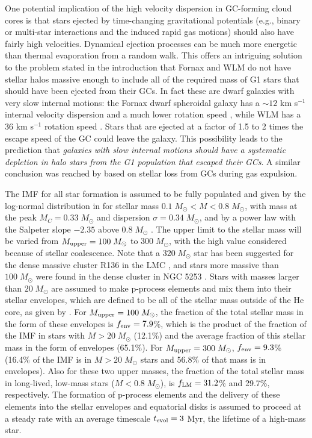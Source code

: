 \documentclass[12pt,preprint]{aastex}
\begin{document}
One potential implication of the high velocity dispersion in GC-forming cloud cores
is that stars ejected by time-changing gravitational potentials (e.g., binary or
multi-star interactions and the induced rapid gas motions) should also have fairly
high velocities. Dynamical ejection processes can be much more energetic than
thermal evaporation from a random walk.  This offers an intriguing solution to the
problem stated in the introduction that Fornax and WLM do not have stellar halos
massive enough to include all of the required mass of G1 stars that should have
been ejected from their GCs.  In fact these are dwarf galaxies with very slow
internal motions: the Fornax dwarf spheroidal galaxy has a $\sim12$ km s$^{-1}$
internal velocity dispersion and a much lower rotation speed \citep{walker06},
while WLM has a 36 km s$^{-1}$ rotation speed \citep{leaman12}. Stars that are
ejected at a factor of 1.5 to 2 times the escape speed of the GC could leave the
galaxy. This possibility leads to the prediction that {\it galaxies with slow
internal motions should have a systematic depletion in halo stars from the G1
population that escaped their GCs}.  A similar conclusion was reached by
\cite{khalaj16} based on stellar loss from GCs during gas expulsion.

The IMF for all star formation is assumed to be fully populated and given by the
log-normal distribution in \cite{paresce00} for stellar mass
$0.1\;M_\odot<M<0.8\;M_\odot$, with mass at the peak $M_C= 0.33\;M_\odot$ and
dispersion $\sigma= 0.34\;M_\odot$, and by a power law with the Salpeter slope
$-2.35$ above $0.8\;M_\odot$ \citep[see also][]{prantzos06}.  The upper limit to
the stellar mass will be varied from $M_{\rm upper}=100\;M_\odot$ to
$300\;M_\odot$, with the high value considered because of stellar coalescence. Note
that a $320\;M_\odot$ star has been suggested for the dense massive cluster R136 in
the LMC \citep{crowther10,crowther16}, and stars more massive than $100\;M_\odot$
were found in the dense cluster in NGC 5253 \citep{smith16}. Stars with masses
larger than $20\;M_\odot$ are assumed to make p-process elements \citep{dec07a} and
mix them into their stellar envelopes, which are defined to be all of the stellar
mass outside of the He core, as given by \cite{prantzos06}. For $M_{\rm
upper}=100\;M_\odot$, the fraction of the total stellar mass in the form of these
envelopes is $f_{\rm env}= 7.9$\%, which is the product of the fraction of the IMF
in stars with $M>20\;M_\odot$ (12.1\%) and the average fraction of this stellar
mass in the form of envelopes (65.1\%). For $M_{\rm upper}=300\;M_\odot$, $f_{\rm
env}= 9.3$\% (16.4\% of the IMF is in $M>20\;M_\odot$ stars and 56.8\% of that mass
is in envelopes). Also for these two upper masses, the fraction of the total
stellar mass in long-lived, low-mass stars ($M<0.8\;M_\odot$), is $f_{\rm LM}=
31.2$\% and 29.7\%, respectively. The formation of p-process elements and the
delivery of these elements into the stellar envelopes and equatorial disks is
assumed to proceed at a steady rate with an average timescale $t_{\rm evol}=3$ Myr,
the lifetime of a high-mass star.
\end{document}
